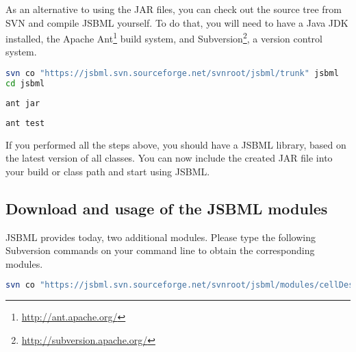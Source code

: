 As an alternative to using the JAR files, you can check out the source tree from
SVN and compile JSBML yourself. To do that, you will need to have a Java
JDK installed, the Apache
Ant\footnote{\url{http://ant.apache.org/}\label{fn:ant}} build system, and
Subversion\footnote{\url{http://subversion.apache.org/}\label{fn:svn}}, a
version control system.

\begin{lstlisting}[language=bash,numbers=none,captionpos=t,
title={Use the following command to download the latest JSBML classes (requires
Subversion\footref{fn:svn}):}]
svn co "https://jsbml.svn.sourceforge.net/svnroot/jsbml/trunk" jsbml
cd jsbml
\end{lstlisting}

\begin{lstlisting}[language=bash,numbers=none,captionpos=t,
title={To compile the JSBML library to a single JAR file, type the following
command (requires Apache Ant\footref{fn:ant}):}]
ant jar
\end{lstlisting}

\begin{lstlisting}[language=bash,numbers=none,captionpos=t,
title={If you want to run the JUnit tests on your compiled JAR file, please use
the following command:}]
ant test
\end{lstlisting}

If you performed all the steps above, you should have a JSBML library, based on
the latest version of all classes. You can now include the created JAR file into
your build or class path and start using JSBML.

\subsection{Download and usage of the JSBML modules}

JSBML provides today, two additional modules. Please type the following
Subversion commands on your command line to obtain the
corresponding modules.


\begin{lstlisting}[language=bash,numbers=none,captionpos=t,
title={The CellDesigner bridge module should help CellDesigner plugin developers
to use JSBML as internal datastructure.}]
svn co "https://jsbml.svn.sourceforge.net/svnroot/jsbml/modules/cellDesigner" cellDesigner
\end{lstlisting}

